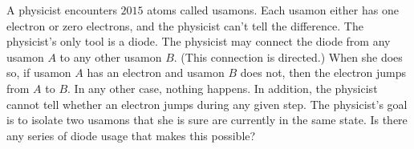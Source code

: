 A physicist encounters $2015$ atoms called usamons. Each usamon either has one electron or zero electrons, and the physicist can't tell the difference. The physicist's only tool is a diode. The physicist may connect the diode from any usamon $A$ to any other usamon $B$. (This connection is directed.) When she does so, if usamon $A$ has an electron and usamon $B$ does not, then the electron jumps from $A$ to $B$. In any other case, nothing happens. In addition, the physicist cannot tell whether an electron jumps during any given step.  The physicist's goal is to isolate two usamons that she is sure are currently in the same state. Is there any series of diode usage that makes this possible?